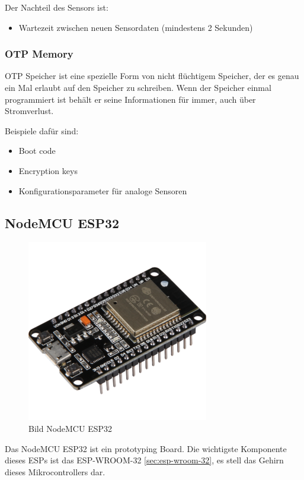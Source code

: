 Der Nachteil des Sensors ist:
\begin{itemize}
    \item Wartezeit zwischen neuen Sensordaten (mindestens 2 Sekunden)
\end{itemize}

\subsubsection{OTP Memory}\label{sec:otp}
OTP Speicher ist eine spezielle Form von nicht flüchtigem Speicher, der es genau ein Mal erlaubt auf den Speicher zu schreiben. Wenn der Speicher einmal programmiert ist behält er seine Informationen für immer, auch über Stromverlust.

Beispiele dafür sind:
\begin{itemize}
    \item Boot code
    \item Encryption keys
    \item Konfigurationsparameter für analoge Sensoren
\end{itemize}

\subsection{NodeMCU ESP32}

\begin{figure}[H]
    \begin{center}
        \includegraphics[scale=0.8]{images/NodeMCU-ESP32.png}
        \caption{Bild NodeMCU ESP32 \cite{nodemcu_picture_joy-it}}
    \end{center}
\end{figure}

Das NodeMCU ESP32 ist ein prototyping Board. Die wichtigste Komponente dieses ESPs ist das ESP-WROOM-32 \ref{sec:esp-wroom-32}, es stell das Gehirn dieses Mikrocontrollers dar.

